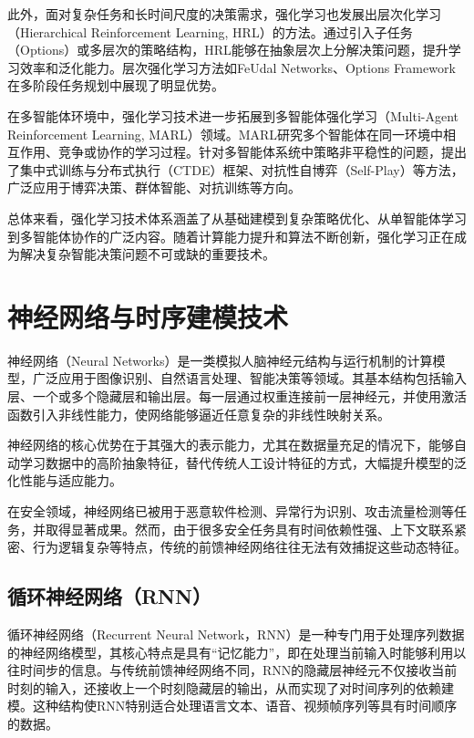 此外，面对复杂任务和长时间尺度的决策需求，强化学习也发展出层次化学习（Hierarchical Reinforcement Learning, HRL）\cite{nachum2018data}的方法。通过引入子任务（Options）或多层次的策略结构，HRL能够在抽象层次上分解决策问题，提升学习效率和泛化能力。层次强化学习方法如FeUdal Networks、Options Framework在多阶段任务规划中展现了明显优势。

在多智能体环境中，强化学习技术进一步拓展到多智能体强化学习（Multi-Agent Reinforcement Learning, MARL）领域。MARL研究多个智能体在同一环境中相互作用、竞争或协作的学习过程。针对多智能体系统中策略非平稳性的问题，提出了集中式训练与分布式执行（CTDE）框架、对抗性自博弈（Self-Play）等方法，广泛应用于博弈决策、群体智能、对抗训练等方向。

总体来看，强化学习技术体系涵盖了从基础建模到复杂策略优化、从单智能体学习到多智能体协作的广泛内容。随着计算能力提升和算法不断创新，强化学习正在成为解决复杂智能决策问题不可或缺的重要技术。

\section{神经网络与时序建模技术}

神经网络（Neural Networks）是一类模拟人脑神经元结构与运行机制的计算模型，广泛应用于图像识别、自然语言处理、智能决策等领域。其基本结构包括输入层、一个或多个隐藏层和输出层。每一层通过权重连接前一层神经元，并使用激活函数引入非线性能力，使网络能够逼近任意复杂的非线性映射关系。

神经网络的核心优势在于其强大的表示能力，尤其在数据量充足的情况下，能够自动学习数据中的高阶抽象特征，替代传统人工设计特征的方式，大幅提升模型的泛化性能与适应能力。

在安全领域，神经网络已被用于恶意软件检测、异常行为识别、攻击流量检测等任务，并取得显著成果。然而，由于很多安全任务具有时间依赖性强、上下文联系紧密、行为逻辑复杂等特点，传统的前馈神经网络往往无法有效捕捉这些动态特征。

\subsection{循环神经网络（RNN）}

循环神经网络（Recurrent Neural Network，RNN）是一种专门用于处理序列数据的神经网络模型，其核心特点是具有“记忆能力”，即在处理当前输入时能够利用以往时间步的信息。与传统前馈神经网络不同，RNN的隐藏层神经元不仅接收当前时刻的输入，还接收上一个时刻隐藏层的输出，从而实现了对时间序列的依赖建模。这种结构使RNN特别适合处理语言文本、语音、视频帧序列等具有时间顺序的数据。

